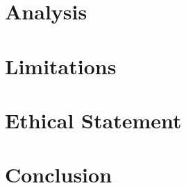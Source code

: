 \documentclass[11pt]{article}
\begin{document}
\section{Analysis}

\section{Limitations}

\section*{Ethical Statement}

\section{Conclusion}


\end{document}
